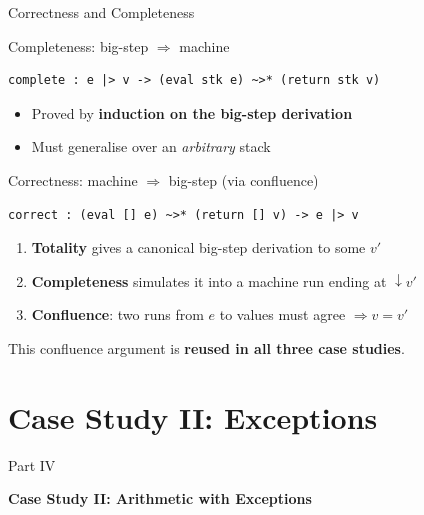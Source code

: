 \documentclass[10pt,compress,aspectratio=169]{beamer}
\begin{document}
\begin{frame}[fragile]{Correctness and Completeness}
  \begin{block}{Completeness: big-step $\Rightarrow$ machine}
    \begin{verbatim}
complete : e |> v -> (eval stk e) ~>* (return stk v)
    \end{verbatim}
    \begin{itemize}
      \item Proved by \textbf{induction on the big-step derivation}
      \item Must generalise over an \emph{arbitrary} stack
    \end{itemize}
  \end{block}
  \medskip
  \begin{block}{Correctness: machine $\Rightarrow$ big-step (via confluence)}
    \begin{verbatim}
correct : (eval [] e) ~>* (return [] v) -> e |> v
    \end{verbatim}
    \begin{enumerate}
      \item \textbf{Totality} gives a canonical big-step derivation to some $v'$
      \item \textbf{Completeness} simulates it into a machine run ending at $\downarrow v'$
      \item \textbf{Confluence}: two runs from $e$ to values must agree $\Rightarrow v = v'$
    \end{enumerate}
  \end{block}
  \smallskip
  {\footnotesize This confluence argument is \textbf{reused in all three case studies}.}
\end{frame}

\section{Case Study II: Exceptions}

\begin{frame}{}
  \centering\vfill
  {Part IV\par}
  \bigskip
  {\Large\bfseries Case Study II: Arithmetic with Exceptions}
  \vfill
\end{frame}
\end{document}
